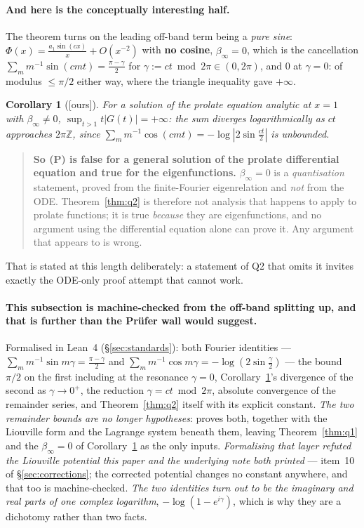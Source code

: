 \documentclass[11pt,a4paper]{article}
\theoremstyle{plain}
\newtheorem{corollary}[theorem]{Corollary}
\theoremstyle{definition}
\theoremstyle{remark}
\newcommand{\ours}{{\normalfont\sffamily\footnotesize[ours]}}
\newcommand{\Z}{\mathbb{Z}}
\newcommand{\file}[1]{\path{#1}}
\begin{document}
\paragraph{And here is the conceptually interesting half.}  The theorem turns on
the leading off-band term being a \emph{pure sine}:
$\Phi(x)=\frac{a_1\sin(cx)}{x}+O(x^{-2})$ with \textbf{no cosine},
$\beta_\infty=0$, which is the cancellation
$\sum_mm^{-1}\sin(cmt)=\frac{\pi-\gamma}{2}$ for
$\gamma:=ct\bmod2\pi\in(0,2\pi)$, and $0$ at $\gamma=0$: of modulus
$\le\pi/2$ either way, where the triangle inequality gave $+\infty$.

\begin{corollary}[\ours]\label{cor:quantisation}
For a solution of the prolate equation analytic at $x=1$ with
$\beta_\infty\ne0$, $\sup_{t>1}t|G(t)|=+\infty$: the sum diverges
logarithmically as $ct$ approaches $2\pi\Z$, since
$\sum_mm^{-1}\cos(cmt)=-\log|2\sin\tfrac{ct}{2}|$ is unbounded.
\end{corollary}

\begin{quote}
\textbf{So (P) is false for a general solution of the prolate differential
equation and true for the eigenfunctions.}  $\beta_\infty=0$ is a
\emph{quantisation} statement, proved from the finite-Fourier eigenrelation and
\emph{not} from the ODE.  Theorem~\ref{thm:q2} is therefore not analysis that
happens to apply to prolate functions; it is true \emph{because} they are
eigenfunctions, and no argument using the differential equation alone can prove
it.  Any argument that appears to is wrong.
\end{quote}

That is stated at this length deliberately: a statement of Q2 that omits it
invites exactly the ODE-only proof attempt that cannot work.

\paragraph{This subsection is machine-checked from the off-band splitting up, and
that is further than the Pr\"ufer wall would suggest.}  Formalised in Lean~4
(\S\ref{sec:standards}): both Fourier identities --- $\sum_mm^{-1}\sin m\gamma
=\frac{\pi-\gamma}{2}$ and $\sum_mm^{-1}\cos m\gamma=-\log(2\sin\frac\gamma2)$
--- the bound $\pi/2$ on the first including at the resonance $\gamma=0$,
Corollary~\ref{cor:quantisation}'s divergence of the second as $\gamma\to0^+$,
the reduction $\gamma=ct\bmod2\pi$, absolute convergence of the remainder series,
and Theorem~\ref{thm:q2} itself with its explicit constant.  \emph{The two
remainder bounds are no longer hypotheses}: \file{lean/Riemann/Remainder.lean}
proves both, together with the Liouville form and the Lagrange system beneath
them, leaving Theorem~\ref{thm:q1} and the $\beta_\infty=0$ of
Corollary~\ref{cor:quantisation} as the only inputs.  \emph{Formalising that
layer refuted the Liouville potential this paper and the underlying note both
printed} --- item~10 of \S\ref{sec:corrections}; the corrected potential changes
no constant anywhere, and that too is machine-checked.  \emph{The two identities turn out to be
the imaginary and real parts of one complex logarithm}, $-\log(1-e^{i\gamma})$,
which is why they are a dichotomy rather than two facts.
\end{document}
